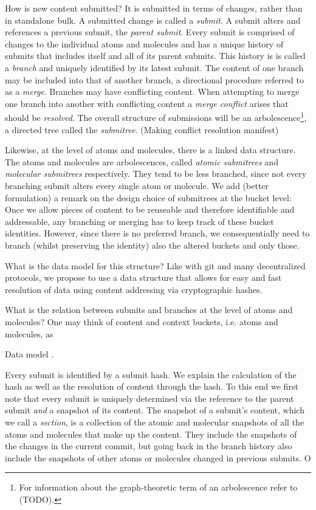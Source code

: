 \documentclass[14pt]{article}
\newcommand{\remark}[1]{{\color{purple} (#1)}}
\begin{document}
How is new content submitted? It is submitted in terms of changes, rather than in standalone bulk. A submitted change is called a \textit{submit}. 
A submit alters and references a previous submit, the \textit{parent submit}.
Every submit is comprised of changes to the individual atoms and molecules and has a unique history of submits that includes itself and all of its parent submits. This history is is called a \textit{branch} and uniquely identified by its latest submit. The content of one branch may be included into that of another branch, a directional procedure referred to as a \textit{merge}. Branches may have conflicting content. When attempting to merge one branch into another with conflicting content a \textit{merge conflict} arises that should be \textit{resolved}. The overall structure of submissions will be an arbolescence\footnote{For information about the graph-theoretic term of an arbolescence refer to \remark{TODO}.}, a directed tree called the \textit{submitree}. 
\remark{Making conflict resolution manifest}

Likewise, at the level of atoms and molecules, there is a linked data structure. The atoms and molecules are arbolescences, called  \textit{atomic submitrees} and \textit{molecular submitrees} respectively. They tend to be less branched, since not every branching submit alters every single atom or molecule. We add \remark{better formulation} a remark on the design choice of submitrees at the bucket level:
Once we allow pieces of content to be reuseable and therefore identifiable and addressable, any branching or merging has to keep track of these bucket identities. However, since there is no preferred branch, we consequentially need to branch (whilst preserving the identity) also the altered buckets and only those. 

What is the data model for this structure? Like with git and many decentralized protocols, we propose to use a data structure that allows for easy and fast resolution of data using content addressing via cryptographic hashes.   

What is the relation between submits and branches at the level of atoms and molecules?
One may think of content and context buckets, i.e. atoms and molecules, as 

Data model .

Every submit is identified by a submit hash. We explain the calculation of the hash as well as the resolution of content through the hash. To this end we first note that every submit is uniquely determined via the reference to the parent submit \textit{and} a snapshot of its content. The snapshot of a submit's content, which we call a \textit{section}, is a collection of the atomic and molecular snapshots of all the atoms and molecules that make up the content. They include the snapshots of the changes in the current commit, but going back in the branch history also include the snapshots of other atoms or molecules changed in previous submits. O 
\end{document}
